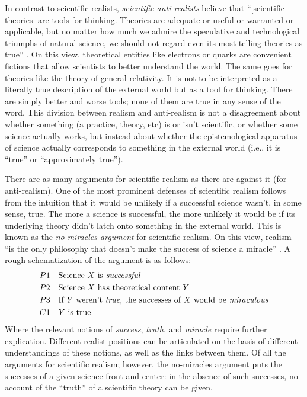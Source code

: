 In contrast to scientific realists, \textit{scientific anti-realists} believe that ``[scientific theories] are tools for thinking. Theories are adequate or useful or warranted or applicable, but no matter how much we admire the speculative and technological triumphs of natural science, we should not regard even its most telling theories as true'' \autocite[21]{hacking1983}. On this view, theoretical entities like electrons or quarks are convenient fictions that allow scientists to better understand the world. The same goes for theories like the theory of general relativity. It is not to be interpreted as a literally true description of the external world but as a tool for thinking. There are simply better and worse tools; none of them are true in any sense of the word. This division between realism and anti-realism is not a disagreement about whether something (a practice, theory, etc) is or isn’t scientific, or whether some science actually works, but instead about whether the epistemological apparatus of science actually corresponds to something in the external world (i.e., it is “true” or “approximately true”).

There are as many arguments for scientific realism as there are against it (for anti-realism). One of the most prominent defenses of scientific realism follows from the intuition that it would be unlikely if a successful science wasn't, in some sense, true. The more a science is successful, the more unlikely it would be if its underlying theory didn't latch onto something in the external world. This is known as the \textit{no-miracles argument} for scientific realism. On this view, realism ``is the only philosophy that doesn't make the success of science a miracle'' \autocite[73]{putnam1975}. A rough schematization of the argument is as follows:
\begin{align*}
    & P1 \quad \text{Science $X$ is \textit{successful}} \\
    & P2 \quad \text{Science $X$ has theoretical content $Y$} \\
    & P3 \quad \text{If $Y$ weren't \textit{true}, the successes of $X$ would be \textit{miraculous}} \\
    & C1 \quad \text{$Y$ is true}
\end{align*}
\noindent Where the relevant notions of \textit{success}, \textit{truth}, and \textit{miracle} require further explication. Different realist positions can be articulated on the basis of different understandings of these notions, as well as the links between them. Of all the arguments for scientific realism; however, the no-miracles argument puts the successes of a given science front and center: in the absence of such successes, no account of the ``truth'' of a scientific theory can be given.

